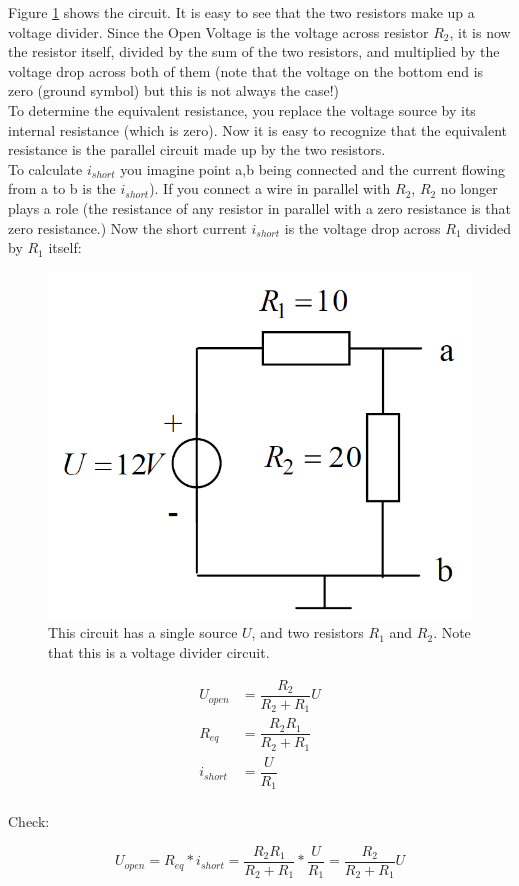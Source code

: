 \documentclass[11pt,letterpaper]{article}
\begin{document}
Figure \ref{fig:HW_Thevenin1} shows the circuit. It is easy to see that the two resistors make up a voltage divider. Since the Open Voltage is the voltage across resistor $R_2$, it is now the resistor itself, divided by the sum of the two resistors, and multiplied by the voltage drop across both of them (note that the voltage on the bottom end is zero (ground symbol) but this is not always the case!)\\

To determine the equivalent resistance, you replace the voltage source by its internal resistance (which is zero). Now it is easy to recognize that the equivalent resistance is the parallel circuit made up by the two resistors.\\

To calculate $i_{short}$ you imagine point a,b being connected and the current flowing from a to b is the $i_{short}$). If you connect a wire in parallel with $R_2$, $R_2$ no longer plays a role (the resistance of any resistor in parallel with a zero resistance is that zero resistance.) Now the short current $i_{short}$ is the voltage drop across $R_1$ divided by $R_1$ itself:

\begin{figure}
\centering
\includegraphics[width=0.4\linewidth]{HW_Thevenin1}
\caption{This circuit has a single source $U$, and two resistors $R_1$ and $R_2$. Note that this is a voltage divider circuit.}
\label{fig:HW_Thevenin1}
\end{figure}

\begin{align}\label{Eqn:HW_Thevenin1}
U_{open} &= \dfrac{R_2}{R_2+R_1} U \\
R_{eq}  &= \dfrac{R_2 R_1}{R_2 + R_1} \\
i_{short} &=  \dfrac{U}{R_1}\\
\end{align}

Check:

\begin{equation}
U_{open} = R_{eq} * i_{short} = \dfrac{R_2 R_1}{R_2 + R_1} * \dfrac{U}{R_1} = \dfrac{R_2}{R_2+R_1} U
\end{equation}
\end{document}
